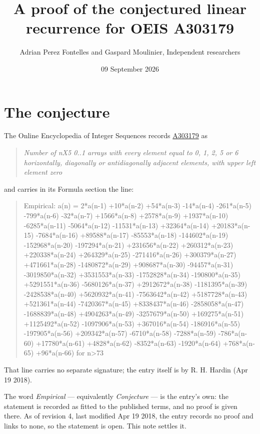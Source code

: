 \documentclass[11pt]{article}
\title{A proof of the conjectured linear recurrence for OEIS A303179}
\author{Adrian Perez Fontelles and Gaspard Moulinier, Independent researchers}
\date{09 September 2026}
\theoremstyle{definition}
\begin{document}
\maketitle
\section{The conjecture}

The Online Encyclopedia of Integer Sequences records \href{https://oeis.org/A303179}{A303179} as

\begin{quote}\itshape Number of nX5 0..1 arrays with every element equal to 0, 1, 2, 5 or 6 horizontally, diagonally or antidiagonally adjacent elements, with upper left element zero\end{quote}

and carries in its Formula section the line:

\begin{quote}\ttfamily Empirical: a(n) = 2*a(n-1) +10*a(n-2) +54*a(n-3) -14*a(n-4) -261*a(n-5) -799*a(n-6) -32*a(n-7) +1566*a(n-8) +2578*a(n-9) +1937*a(n-10) -6285*a(n-11) -5064*a(n-12) -11531*a(n-13) +32364*a(n-14) +20183*a(n-15) -7684*a(n-16) +89588*a(n-17) -85553*a(n-18) -144602*a(n-19) -152968*a(n-20) -197294*a(n-21) +231656*a(n-22) +260312*a(n-23) +220338*a(n-24) +264329*a(n-25) -271416*a(n-26) +300379*a(n-27) +471661*a(n-28) -1480872*a(n-29) +908687*a(n-30) -94457*a(n-31) -3019850*a(n-32) +3531553*a(n-33) -1752828*a(n-34) -190800*a(n-35) +5291551*a(n-36) -5680126*a(n-37) +2912672*a(n-38) -1181395*a(n-39) -2428538*a(n-40) +5620932*a(n-41) -7563642*a(n-42) +5187728*a(n-43) +521361*a(n-44) -7420367*a(n-45) +8338437*a(n-46) -2858058*a(n-47) -1688839*a(n-48) +4904263*a(n-49) -3257679*a(n-50) +169275*a(n-51) +1125492*a(n-52) -1097906*a(n-53) +367016*a(n-54) -186916*a(n-55) -197905*a(n-56) +209342*a(n-57) -6710*a(n-58) -7288*a(n-59) -786*a(n-60) +17780*a(n-61) +4828*a(n-62) -8352*a(n-63) -1920*a(n-64) +768*a(n-65) +96*a(n-66) for n>73\end{quote}

That line carries no separate signature; the entry itself is by R. H. Hardin (Apr 19 2018).

The word {\itshape Empirical} --- equivalently {\itshape Conjecture} --- is the entry's own: the statement is recorded as fitted to the published terms, and no proof is given there. As of revision 4, last modified Apr 19 2018, the entry records no proof and links to none, so the statement is open. This note settles it.
\end{document}
